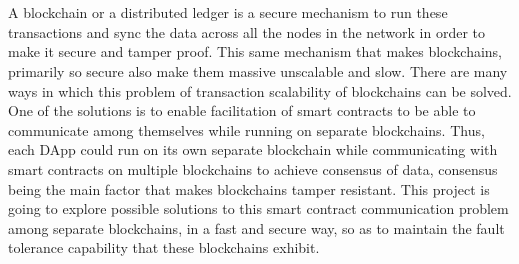 \documentclass[a4paper,twoside,phd]{BYUPhys}
\begin{document}
\\
\\
A blockchain or a distributed ledger is a secure mechanism to run these transactions and sync the data across all the nodes in the network in order to make it secure and tamper proof. This same mechanism that makes blockchains, primarily so secure also make them massive unscalable and slow. There are many ways in which this problem of transaction scalability of blockchains can be solved. One of the solutions is to enable facilitation of smart contracts to be able to communicate among themselves while running on separate blockchains. Thus, each DApp could run on its own separate blockchain while communicating with smart contracts on multiple blockchains to achieve consensus of data, consensus being the main factor that makes blockchains tamper resistant. This project is going to explore possible solutions to this smart contract communication problem among separate blockchains, in a fast and secure way, so as to maintain the fault tolerance capability that these blockchains exhibit.
\end{document}
